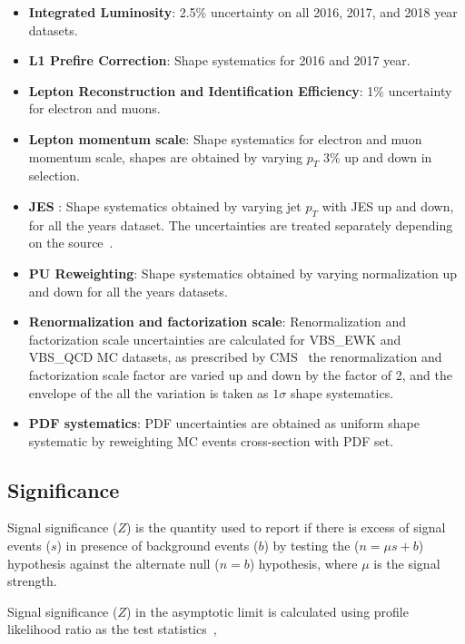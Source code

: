 \begin{itemize}
  \item \textbf{Integrated Luminosity}: 2.5\%
        uncertainty on all 2016, 2017, and 2018
        year datasets.
  \item \textbf{L1 Prefire Correction}: Shape systematics for 2016 and 2017
        year.
  \item \textbf{Lepton Reconstruction and Identification Efficiency}: 1\%
        uncertainty for electron and muons.
  \item \textbf{Lepton momentum scale}: Shape systematics for electron
        and muon momentum scale, shapes are obtained by varying \(p_T\) 3\% up and
        down in selection.
  \item \textbf{\gls{JES} }: Shape systematics
        obtained by varying jet \( p_T \) with \gls{JES} up and down,
        for all the years dataset. The uncertainties
        are treated separately depending on the source~\cite{CMS-DP-2020-019}.
  \item \textbf{PU Reweighting}: Shape systematics
        obtained by varying normalization up and down for all the years datasets.
  \item \textbf{Renormalization and factorization scale}:
        Renormalization and factorization scale uncertainties
        are calculated for VBS\_EWK and VBS\_QCD \gls{MC} datasets,
        as prescribed by \gls{CMS}~\cite{Ballestrero2018} the renormalization and factorization
        scale factor are varied up and down by the factor of 2,
        and the envelope of the all the variation is taken as \( 1\sigma \)
        shape systematics.
  \item \textbf{PDF systematics}: \gls{PDF} uncertainties
        are obtained as uniform shape systematic by reweighting \gls{MC} events cross-section
        with \gls{PDF} set.
\end{itemize}

\subsection{
  Significance
}

Signal significance (\( Z \)) is
the quantity used to report if there is excess of signal events (\( s \)) in
presence of background events (\( b \)) by testing the (\( n = \mu s + b \)) hypothesis
against the alternate null (\( n = b \)) hypothesis, where \( \mu \) is the signal strength.

Signal significance (\( Z \)) in the asymptotic limit
is calculated using profile likelihood ratio as the test statistics~\cite{Cowan2010},

